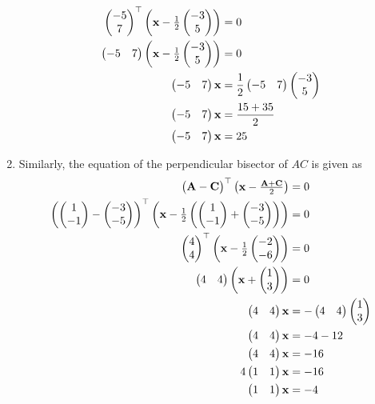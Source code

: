 \documentclass[]{article}
\begin{document}
\begin{enumerate}
{\begin{align}
{\myvec{-5\\7}}^\top \myvec{\vec{x} - \frac{1}{2}\myvec{-3\\5}} &= 0\\
\myvec{-5&7} \myvec{\vec{x} - \frac{1}{2}\myvec{-3\\5}} &= 0\\
\myvec{-5&7}\vec{x} &= \frac{1}{2}\myvec{-5&7}\myvec{-3\\5}\\
\myvec{-5&7}\vec{x} &= \frac{15+35}{2}\\
\myvec{-5&7}\vec{x} &= 25
\end{align}}
\item {Similarly, the equation of the perpendicular bisector of $AC$ is given as
\begin{align}
{\myvec{\vec{A}-\vec{C}}}^\top \myvec{\vec{x} - \frac{\vec{A}+\vec{C}}{2}} &= 0 \\
{\myvec{\myvec{1\\-1}-\myvec{-3\\-5}}}^\top \myvec{\vec{x} - \frac{1}{2} \myvec{\myvec{1\\-1}+\myvec{-3\\-5}}  } &= 0 \\
{\myvec{4\\4}}^\top \myvec{\vec{x} - \frac{1}{2}\myvec{-2\\-6}} &= 0\\
\myvec{4&4}\myvec{\vec{x}+\myvec{1\\3}} &= 0\\
\myvec{4&4}\vec{x} &= -\myvec{4&4}\myvec{1\\3}\\
\myvec{4&4}\vec{x} &= -4-12 \\
\myvec{4&4}\vec{x} &= -16 \\
4\myvec{1&1}\vec{x} &= -16 \\
\myvec{1&1}\vec{x} &= -4
\end{align}}
\end{enumerate}
\end{document}
